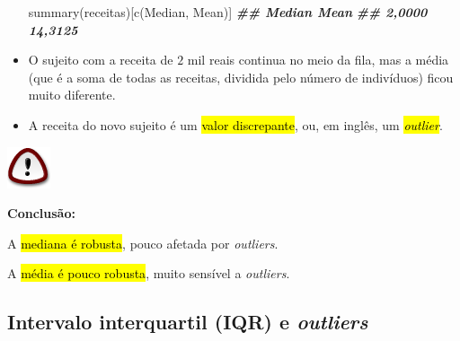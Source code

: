 \documentclass[
  11pt]{report}
\newenvironment{Shaded}{\begin{snugshade}}{\end{snugshade}}
\newcommand{\DocumentationTok}[1]{\textcolor[rgb]{0.56,0.35,0.01}{\textbf{\textit{#1}}}}
\newcommand{\FunctionTok}[1]{\textcolor[rgb]{0.00,0.00,0.00}{#1}}
\newcommand{\NormalTok}[1]{#1}
\newcommand{\StringTok}[1]{\textcolor[rgb]{0.31,0.60,0.02}{#1}}
\newenvironment{rmdimportant}
{
  \begin{myimportant}
    \includegraphics{images/important.png}
    \tcblower
  }
  {
  \end{myimportant}
}
\renewenvironment{Shaded}{
  \begin{mdframed}[%
    roundcorner=2pt,%
    innerleftmargin=5pt,%
    innerrightmargin=5pt,%
    topline=true,%
    leftline=true,%
    rightline=true,%
    bottomline=true,%
    linewidth=0.5pt,%
    linecolor=black!20,%
    backgroundcolor=black!2,%
    skipabove=2ex,%
    skipbelow=2.5ex%
  ]%
}
{
  \end{mdframed}
}
\begin{document}
\begin{itemize}
\begin{Shaded}
\begin{Highlighting}[]
\FunctionTok{summary}\NormalTok{(receitas)[}\FunctionTok{c}\NormalTok{(}\StringTok{\textquotesingle{}Median\textquotesingle{}}\NormalTok{, }\StringTok{\textquotesingle{}Mean\textquotesingle{}}\NormalTok{)]}
\DocumentationTok{\#\#  Median    Mean }
\DocumentationTok{\#\#  2,0000 14,3125}
\end{Highlighting}
\end{Shaded}
\item
  O sujeito com a receita de $2$ mil reais continua no meio da fila, mas a média (que é a soma de todas as receitas, dividida pelo número de indivíduos) ficou muito diferente.
\item
  A receita do novo sujeito é um {\hl{valor discrepante}}, ou, em inglês, um {\hl{\emph{outlier}}}.
\end{itemize}

\begin{rmdimportant}
\textbf{Conclusão:}

A {\hl{mediana é robusta}}, pouco afetada por \emph{outliers}.

A {\hl{média é pouco robusta}}, muito sensível a \emph{outliers}.

\end{rmdimportant}

\hypertarget{intervalo-interquartil-iqr-e-outliers}{%
\subsection{\texorpdfstring{Intervalo interquartil (IQR) e \emph{outliers}}{Intervalo interquartil (IQR) e outliers}}\label{intervalo-interquartil-iqr-e-outliers}}
\end{document}
